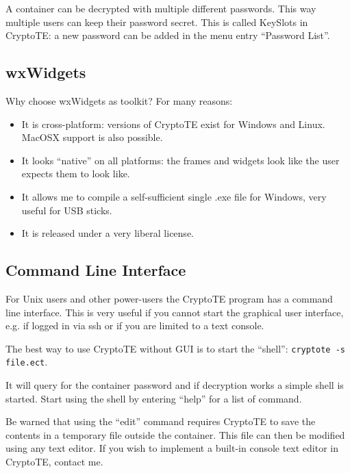 \documentclass[a4paper,12pt,twoside,draft]{article}
\begin{document}
A container can be decrypted with multiple different passwords. This way multiple users can keep their password secret. This is called KeySlots in CryptoTE: a new password can be added in the menu entry ``Password List''.

\subsection{wxWidgets}\label{wxWidgets}

Why choose wxWidgets as toolkit? For many reasons:

\begin{itemize}
  \item It is cross-platform: versions of CryptoTE exist for Windows and Linux. MacOSX support is also possible.
  \item It looks ``native'' on all platforms: the frames and widgets look like the user expects them to look like.
  \item It allows me to compile a self-sufficient single .exe file for Windows, very useful for USB sticks.
  \item It is released under a very liberal license.
\end{itemize}

\subsection{Command Line Interface}\label{Commandline}

For Unix users and other power-users the CryptoTE program has a command line interface. This is very useful if you cannot start the graphical user interface, e.g. if logged in via ssh or if you are limited to a text console.

The best way to use CryptoTE without GUI is to start the ``shell'': \texttt{cryptote -s file.ect}.

It will query for the container password and if decryption works a simple shell is started. Start using the shell by entering ``help'' for a list of command.

Be warned that using the ``edit'' command requires CryptoTE to save the contents in a temporary file outside the container. This file can then be modified using any text editor. If you wish to implement a built-in console text editor in CryptoTE, contact me.
\end{document}

